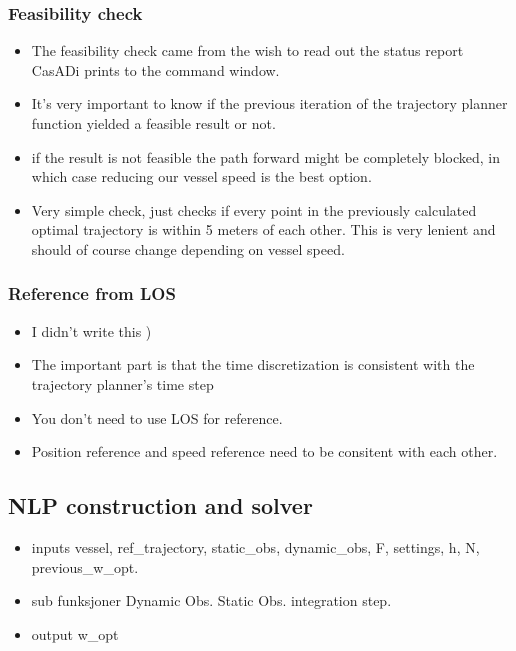 \subsubsection{Feasibility check}
\begin{itemize}
    \item The feasibility check came from the wish to read out the status report CasADi prints to the command window.
    \item It's very important to know if the previous iteration of the trajectory planner function yielded a feasible result or not.
    \item if the result is not feasible the path forward might be completely blocked, in which case reducing our vessel speed is the best option.
    \item Very simple check, just checks if every point in the previously calculated optimal trajectory is within 5 meters of each other. This is very lenient and should of course change depending on vessel speed.
\end{itemize}

\subsubsection{Reference from LOS}
\begin{itemize}
    \item I didn't write this \:)
    \item The important part is that the time discretization is consistent with the trajectory planner's time step
    \item You don't need to use LOS for reference.
    \item Position reference and speed reference need to be consitent with each other.
\end{itemize} 


\subsection{NLP construction and solver}
\begin{itemize}
    \item inputs\: vessel, ref\_trajectory, static\_obs, dynamic\_obs, F, settings, h, N, previous\_w\_opt.
    \item sub funksjoner\:
    \subitem Dynamic Obs.
    \subitem Static Obs.
    \subitem integration step.
    \item output\: w\_opt
\end{itemize}

